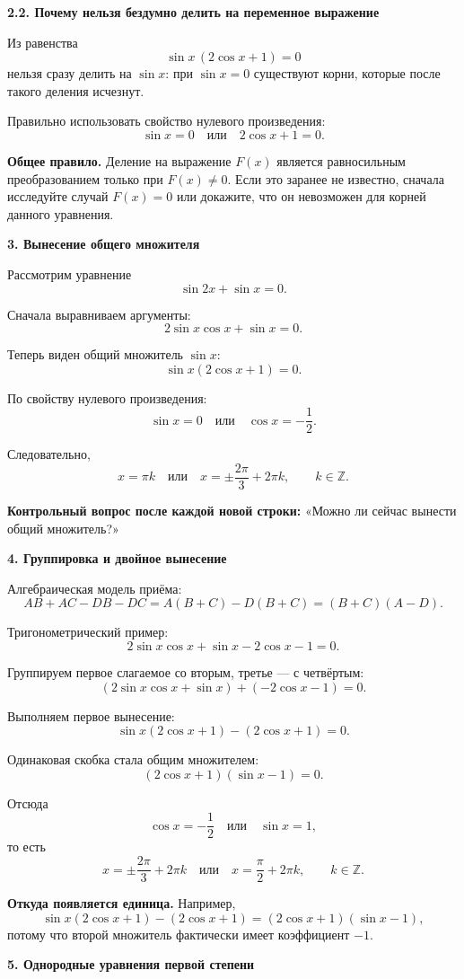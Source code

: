 \documentclass[a4paper,12pt]{article}
\newcommand{\sect}[1]{%
  \vspace{0.45em}%
  {\Large\bfseries\color{darkaccent}#1}\par
  \vspace{0.2em}%
  \noindent{\color{rulegray}\rule{\linewidth}{0.6pt}}%
  \vspace{0.35em}%
}
\newcommand{\subsect}[1]{%
  \vspace{0.35em}%
  {\large\bfseries\color{accent}#1}\par
  \vspace{0.1em}%
}
\newcommand{\key}[1]{\textbf{\color{darkaccent}#1}}
\newcommand{\Z}{\mathbb{Z}}
\begin{document}
\subsect{2.2. Почему нельзя бездумно делить на переменное выражение}

Из равенства
\[
\sin x\,(2\cos x+1)=0
\]
нельзя сразу делить на $\sin x$: при $\sin x=0$ существуют корни,
которые после такого деления исчезнут.

Правильно использовать свойство нулевого произведения:
\[
\sin x=0
\quad\text{или}\quad
2\cos x+1=0.
\]

\key{Общее правило.}
Деление на выражение $F(x)$ является равносильным преобразованием только при
$F(x)\ne0$. Если это заранее не известно, сначала исследуйте случай
$F(x)=0$ или докажите, что он невозможен для корней данного уравнения.

\sect{3. Вынесение общего множителя}

Рассмотрим уравнение
\[
\sin 2x+\sin x=0.
\]

Сначала выравниваем аргументы:
\[
2\sin x\cos x+\sin x=0.
\]

Теперь виден общий множитель $\sin x$:
\[
\sin x(2\cos x+1)=0.
\]

По свойству нулевого произведения:
\[
\sin x=0
\quad\text{или}\quad
\cos x=-\frac12.
\]

Следовательно,
\[
x=\pi k
\quad\text{или}\quad
x=\pm\frac{2\pi}{3}+2\pi k,
\qquad k\in\Z.
\]

\key{Контрольный вопрос после каждой новой строки:}
«Можно ли сейчас вынести общий множитель?»

\sect{4. Группировка и двойное вынесение}

Алгебраическая модель приёма:
\[
AB+AC-DB-DC
=A(B+C)-D(B+C)
=(B+C)(A-D).
\]

Тригонометрический пример:
\[
2\sin x\cos x+\sin x-2\cos x-1=0.
\]

Группируем первое слагаемое со вторым, третье --- с четвёртым:
\[
(2\sin x\cos x+\sin x)+(-2\cos x-1)=0.
\]

Выполняем первое вынесение:
\[
\sin x(2\cos x+1)-(2\cos x+1)=0.
\]

Одинаковая скобка стала общим множителем:
\[
(2\cos x+1)(\sin x-1)=0.
\]

Отсюда
\[
\cos x=-\frac12
\quad\text{или}\quad
\sin x=1,
\]
то есть
\[
x=\pm\frac{2\pi}{3}+2\pi k
\quad\text{или}\quad
x=\frac{\pi}{2}+2\pi k,
\qquad k\in\Z.
\]

\key{Откуда появляется единица.}
Например,
\[
\sin x(2\cos x+1)-(2\cos x+1)
=(2\cos x+1)(\sin x-1),
\]
потому что второй множитель фактически имеет коэффициент $-1$.

\sect{5. Однородные уравнения первой степени}
\end{document}
